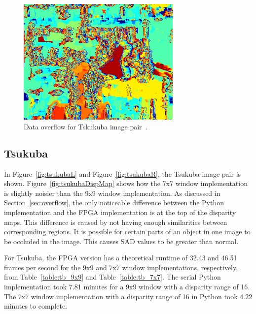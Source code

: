\begin{figure}[h]
	\begin{center}
		\includegraphics[width=80mm]{figures/tsukuba_disp9x9_2_sad_overflow.png}
		\captionfonts
		\caption{Data overflow for Tskukuba image pair~\cite{middlebury}.}
		\label{fig:overflow}
	\end{center}
\end{figure}

\subsection{Tsukuba}
\label{sec:tsukuba}

In Figure~\ref{fig:tsukubaL} and Figure~\ref{fig:tsukubaR}, the Tsukuba image pair is shown. Figure~\ref{fig:tsukubaDispMap} shows how the 7x7 window implementation is slightly noisier than the 9x9 window implementation. As discussed in Section~\ref{sec:overflow}, the only noticeable difference between the Python implementation and the FPGA implementation is at the top of the disparity maps. This difference is caused by not having enough similarities between corresponding regions. It is possible for certain parts of an object in one image to be occluded in the image. This causes SAD values to be greater than normal. 

For Tsukuba, the FPGA version has a theoretical runtime of 32.43 and 46.51 frames per second for the 9x9 and 7x7 window implementations, respectively, from Table~\ref{table:tb_9x9} and Table~\ref{table:tb_7x7}. The serial Python implementation took 7.81 minutes for a 9x9 window with a disparity range of 16. The 7x7 window implementation with a disparity range of 16 in Python took 4.22 minutes to complete.

